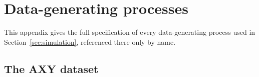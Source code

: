 \documentclass[11pt]{article}
\theoremstyle{plain}
\theoremstyle{definition}
\theoremstyle{remark}
\newcommand{\betahat}{\widehat{\beta}}
\newcommand{\gps}{e}
\begin{document}
%
%

\section{Data-generating processes}
\label{app:dgp}

This appendix gives the full specification of every data-generating process used in
Section~\ref{sec:simulation}, referenced there only by name.

\subsection{The AXY dataset}
\label{app:dgp-axy}
\end{document}
